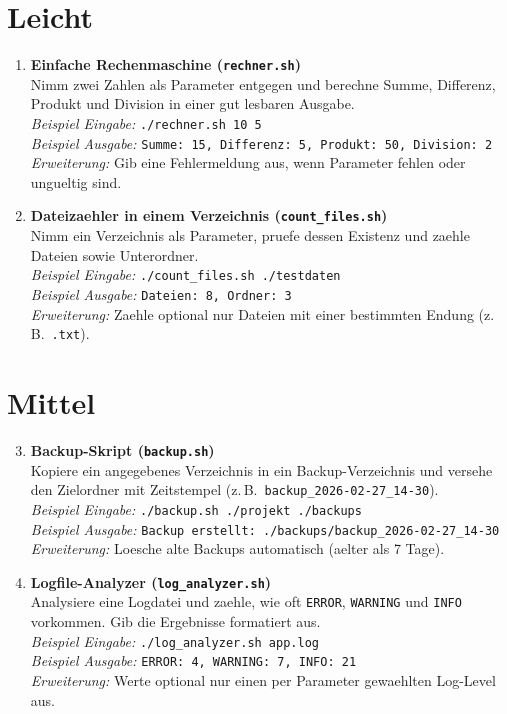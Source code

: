 \documentclass[11pt, oneside, numbers=noenddot]{scrbook}
\begin{document}
\section{Leicht}
\begin{enumerate}
\item \textbf{Einfache Rechenmaschine (\texttt{rechner.sh})}\\
Nimm zwei Zahlen als Parameter entgegen und berechne Summe, Differenz, Produkt und Division in einer gut lesbaren Ausgabe.\\
\textit{Beispiel Eingabe:} \texttt{./rechner.sh 10 5}\\
\textit{Beispiel Ausgabe:} \texttt{Summe: 15, Differenz: 5, Produkt: 50, Division: 2}\\
\textit{Erweiterung:} Gib eine Fehlermeldung aus, wenn Parameter fehlen oder ungueltig sind.

\item \textbf{Dateizaehler in einem Verzeichnis (\texttt{count\_files.sh})}\\
Nimm ein Verzeichnis als Parameter, pruefe dessen Existenz und zaehle Dateien sowie Unterordner.\\
\textit{Beispiel Eingabe:} \texttt{./count\_files.sh ./testdaten}\\
\textit{Beispiel Ausgabe:} \texttt{Dateien: 8, Ordner: 3}\\
\textit{Erweiterung:} Zaehle optional nur Dateien mit einer bestimmten Endung (z.\,B.\ \texttt{.txt}).
\end{enumerate}

\section{Mittel}
\begin{enumerate}
\setcounter{enumi}{2}
\item \textbf{Backup-Skript (\texttt{backup.sh})}\\
Kopiere ein angegebenes Verzeichnis in ein Backup-Verzeichnis und versehe den Zielordner mit Zeitstempel (z.\,B.\ \texttt{backup\_2026-02-27\_14-30}).\\
\textit{Beispiel Eingabe:} \texttt{./backup.sh ./projekt ./backups}\\
\textit{Beispiel Ausgabe:} \texttt{Backup erstellt: ./backups/backup\_2026-02-27\_14-30}\\
\textit{Erweiterung:} Loesche alte Backups automatisch (aelter als 7 Tage).

\item \textbf{Logfile-Analyzer (\texttt{log\_analyzer.sh})}\\
Analysiere eine Logdatei und zaehle, wie oft \texttt{ERROR}, \texttt{WARNING} und \texttt{INFO} vorkommen. Gib die Ergebnisse formatiert aus.\\
\textit{Beispiel Eingabe:} \texttt{./log\_analyzer.sh app.log}\\
\textit{Beispiel Ausgabe:} \texttt{ERROR: 4, WARNING: 7, INFO: 21}\\
\textit{Erweiterung:} Werte optional nur einen per Parameter gewaehlten Log-Level aus.
\end{enumerate}
\end{document}
